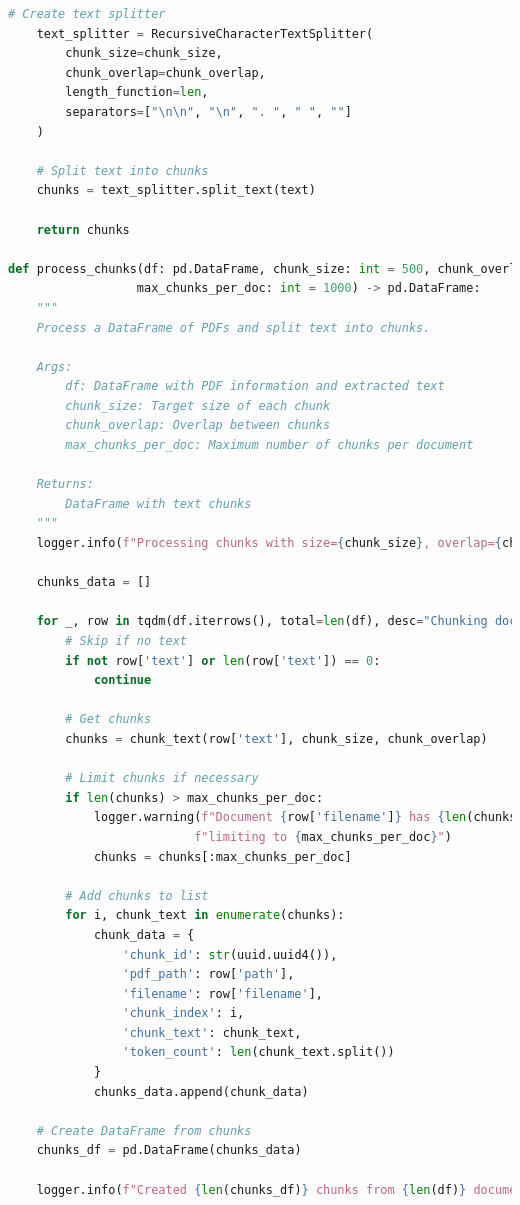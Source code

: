 \documentclass[
  screen,review,acmlarge]{acmart}
\begin{document}
\begin{lstlisting}[language=Python]
    # Create text splitter
    text_splitter = RecursiveCharacterTextSplitter(
        chunk_size=chunk_size,
        chunk_overlap=chunk_overlap,
        length_function=len,
        separators=["\n\n", "\n", ". ", " ", ""]
    )
    
    # Split text into chunks
    chunks = text_splitter.split_text(text)
    
    return chunks

def process_chunks(df: pd.DataFrame, chunk_size: int = 500, chunk_overlap: int = 50, 
                  max_chunks_per_doc: int = 1000) -> pd.DataFrame:
    """
    Process a DataFrame of PDFs and split text into chunks.
    
    Args:
        df: DataFrame with PDF information and extracted text
        chunk_size: Target size of each chunk
        chunk_overlap: Overlap between chunks
        max_chunks_per_doc: Maximum number of chunks per document
        
    Returns:
        DataFrame with text chunks
    """
    logger.info(f"Processing chunks with size={chunk_size}, overlap={chunk_overlap}")
    
    chunks_data = []
    
    for _, row in tqdm(df.iterrows(), total=len(df), desc="Chunking documents"):
        # Skip if no text
        if not row['text'] or len(row['text']) == 0:
            continue
            
        # Get chunks
        chunks = chunk_text(row['text'], chunk_size, chunk_overlap)
        
        # Limit chunks if necessary
        if len(chunks) > max_chunks_per_doc:
            logger.warning(f"Document {row['filename']} has {len(chunks)} chunks, "
                          f"limiting to {max_chunks_per_doc}")
            chunks = chunks[:max_chunks_per_doc]
        
        # Add chunks to list
        for i, chunk_text in enumerate(chunks):
            chunk_data = {
                'chunk_id': str(uuid.uuid4()),
                'pdf_path': row['path'],
                'filename': row['filename'],
                'chunk_index': i,
                'chunk_text': chunk_text,
                'token_count': len(chunk_text.split())
            }
            chunks_data.append(chunk_data)
    
    # Create DataFrame from chunks
    chunks_df = pd.DataFrame(chunks_data)
    
    logger.info(f"Created {len(chunks_df)} chunks from {len(df)} documents")
    

\end{lstlisting}
\end{document}
